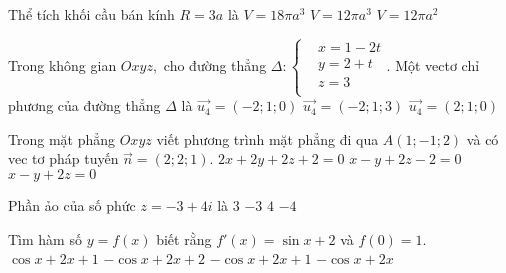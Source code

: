 \begin{ex}%
	Thể tích khối cầu bán kính $R=3a$ là
	{ $V=18\pi {a^3}$}
	{ $V=12\pi {a^3}$}
	{ $V=12\pi {a^2}$}
\end{ex}
\begin{ex}%
	Trong không gian $Oxyz,$ cho đường thẳng $\Delta :\left\{ \begin{aligned}
		& x=1-2t \\
		& y=2+t \\
		& z=3 \\
	\end{aligned} \right..$ Một vectơ chỉ phương của đường thẳng $\Delta $ là
	{\True $\overrightarrow{u_4}=\left( -2;1;0 \right)$}
	{ $\overrightarrow{u_4}=\left( -2;1;3 \right)$}
	{ $\overrightarrow{u_4}=\left( 2;1;0 \right)$}
\end{ex}
\begin{ex}%
	Trong mặt phẳng $Oxyz$ viết phương trình mặt phẳng đi qua $A(1;-1;2)$ và có vec tơ pháp tuyến $\overrightarrow{n}=(2;2;1)$.
	{ $2x+2y+2z+2=0$}
	{ $x-y+2z-2=0$}
	{ $x-y+2z=0$}
\end{ex}
\begin{ex}%
	Phần ảo của số phức $z = -3 + 4i$ là
	\choice
	{ $3$}
	{ $-3$}
	{\True $4$}
	{ $-4$}
\end{ex}

\begin{ex}%
	Tìm hàm số $y = f(x)$ biết rằng $f'(x) = \sin x + 2$ và $f(0) = 1$.
	\choice
	{ $\cos x + 2x + 1$}
	{\True $-\cos x + 2x + 2$}
	{ $-\cos x + 2x + 1$}
	{ $-\cos x + 2x$}
\end{ex}

